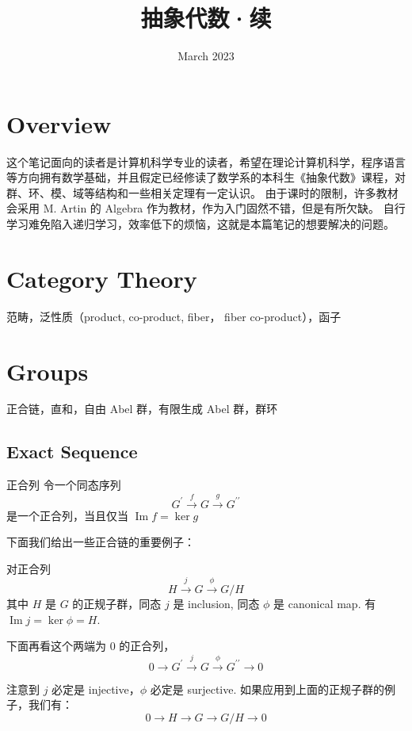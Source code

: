 \documentclass[a4paper, 12pt]{article}
\title{抽象代数·续}
\date{March 2023}
\DeclareMathOperator{\image}{Im}
\begin{document}
\maketitle

\section{Overview}
这个笔记面向的读者是计算机科学专业的读者，希望在理论计算机科学，程序语言等方向拥有数学基础，并且假定已经修读了数学系的本科生《抽象代数》课程，对群、环、模、域等结构和一些相关定理有一定认识。
由于课时的限制，许多教材会采用 M. Artin 的 Algebra 作为教材，作为入门固然不错，但是有所欠缺。
自行学习难免陷入递归学习，效率低下的烦恼，这就是本篇笔记的想要解决的问题。

\section{Category Theory}

范畴，泛性质（product, co-product, fiber， fiber co-product），函子

\section{Groups}
正合链，直和，自由 Abel 群，有限生成 Abel 群，群环

\subsection{Exact Sequence}
\begin{Definition}{正合列}{}
令一个同态序列
\[
G^\prime \stackrel{f}{\rightarrow} G \stackrel{g}{\rightarrow} G^{\prime\prime}
\]
是一个正合列，当且仅当 $\image f = \ker g$

\end{Definition}

下面我们给出一些正合链的重要例子：

\begin{Example}{}{}
对正合列
\[
H \stackrel{j}{\rightarrow} G \stackrel{\phi}{\rightarrow} G/H
\]
其中 $H$ 是 $G$ 的正规子群，同态 $j$ 是 inclusion, 同态 $\phi$ 是 canonical map.
有 $\image j = \ker \phi = H$.


下面再看这个两端为 $0$ 的正合列，
\[
0 \rightarrow G^\prime \stackrel{j}{\rightarrow} G \stackrel{\phi}{\rightarrow} G^{\prime\prime} \rightarrow 0
\]

注意到 $j$ 必定是 injective，$\phi$ 必定是 surjective.
如果应用到上面的正规子群的例子，我们有：
\[
0 \rightarrow H \rightarrow G \rightarrow G/H \rightarrow 0
\]
\end{Example}
\end{document}
